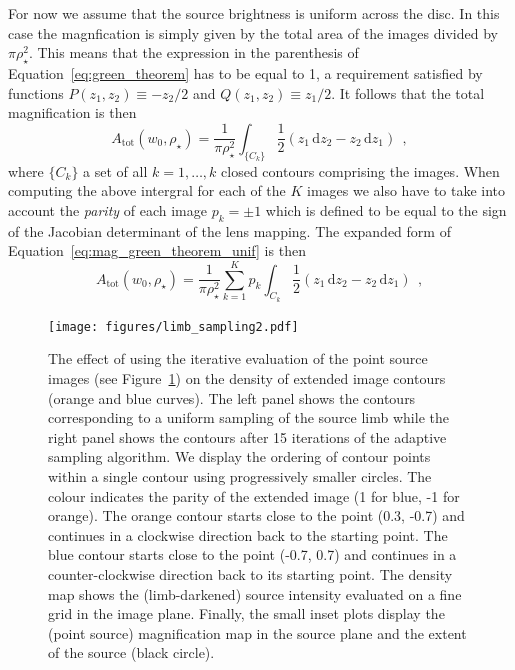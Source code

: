 \documentclass[12pt,dvipsnames]{report}
\newcommand{\ud}{\,\mathrm{d}}
\newcommand{\hquad}{~~}
\begin{document}
For now we assume that the source brightness is uniform across the disc. In
this case the magnfication is simply given by the total area of the images
divided by $\pi\rho_\star^2$. This means that the expression in the parenthesis
of Equation~\ref{eq:green_theorem} has to be equal to 1, a requirement
satisfied by functions $P(z_1, z_2)\equiv -z_2/2$ and $Q(z_1, z_2)\equiv
    z_1/2$. It follows that the total magnification is then
\begin{equation}
    A_\mathrm{tot}\left(w_0, \rho_{\star}\right)=\frac{1}{\pi \rho_{\star}^{2}}
    \int_{\{C_k\}} \frac{1}{2}(z_{1} \ud z_{2}-z_{2} \ud z_{1})\hquad ,
    \label{eq:mag_green_theorem_unif}
\end{equation}
where $\{C_k\}$ a set of all $k=1,\dots,k$ closed contours comprising the images.
When computing the  above intergral for each of the $K$ images  we also have to
take into account the \textsl{parity} of each image $p_k=\pm 1$ which is defined to
be equal to the sign of the Jacobian determinant of the lens mapping. The expanded
form of Equation~\ref{eq:mag_green_theorem_unif} is then
\begin{equation}
    A_\mathrm{tot}\left(w_0, \rho_{\star}\right)=\frac{1}{\pi \rho_{\star}^{2}}
    \sum_{k=1}^Kp_k\int_{C_k} \frac{1}{2}(z_{1} \ud z_{2}-z_{2} \ud z_{1})\hquad ,
    \label{eq:mag_green_theorem_unif_expanded}
\end{equation}

\begin{figure}[t]
    \begin{centering}
        \texttt{[image: figures/limb\_sampling2.pdf]}
        \caption{The effect of using the iterative evaluation of the point
            source images (see Figure~\ref{fig:limb_sampling1}) on the density of
            extended image contours (orange and blue curves).  The left panel shows
            the contours corresponding to a uniform sampling of the source limb while
            the right panel shows the contours after 15 iterations of the adaptive
            sampling algorithm. We display the ordering of contour points within a
            single contour using  progressively smaller circles. The colour indicates
            the parity of the extended image (1 for blue, -1 for orange).
            The orange contour starts close
            to the point (0.3, -0.7) and continues in a clockwise direction back
            to the starting point. The blue contour starts close to the point
            (-0.7, 0.7) and continues in a counter-clockwise direction back to its
            starting point. The density map shows the (limb-darkened) source
            intensity evaluated on a fine grid in the image plane. Finally, the small
            inset plots display the (point source) magnification map in the source plane
            and the extent of the source (black circle).
        }
        \label{fig:limb_sampling1}
    \end{centering}
\end{figure}
\end{document}
